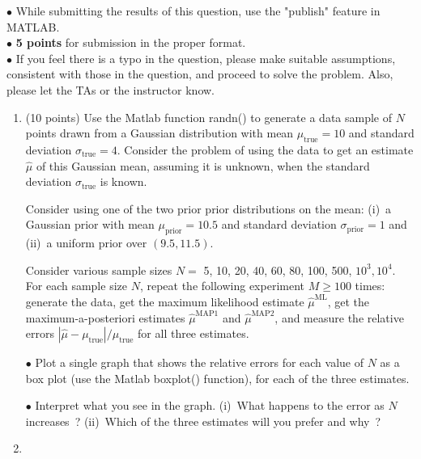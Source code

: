 \documentclass[11pt]{article}
\begin{document}
$\bullet$ While submitting the results of this question, use the "publish" feature in MATLAB. \\

$\bullet$ {\bf 5 points} for submission in the proper format. \\

$\bullet$ If you feel there is a typo in the question, please make suitable assumptions, consistent with those in the question, and proceed to solve
the problem. Also, please let the TAs or the instructor know. \\


\begin {enumerate}
  
\item %
  
  (10 points) Use the Matlab function randn() to generate a data sample of $N$ points drawn from a Gaussian distribution with mean $\mu_{\text{true}}
  = 10$ and standard deviation $\sigma_{\text{true}} = 4$.  Consider the problem of using the data to get an estimate $\widehat \mu$ of this Gaussian
  mean, assuming it is unknown, when the standard deviation $\sigma_{\text{true}}$ is known.
  
  Consider using one of the two prior prior distributions on the mean: (i)~a Gaussian prior with mean $\mu_{\text{prior}} = 10.5$ and standard
  deviation $\sigma_{\text{prior}} = 1$ and (ii)~a uniform prior over $(9.5, 11.5)$.
  
  Consider various sample sizes $N = $ 5, 10, 20, 40, 60, 80, 100, 500, $10^3, 10^4$.  For each sample size $N$, repeat the following experiment $M
  \ge 100$ times: generate the data, get the maximum likelihood estimate $\widehat \mu^{\text{ML}}$, get the maximum-a-posteriori estimates $\widehat
  \mu^{\text{MAP1}}$ and $\widehat \mu^{\text{MAP2}}$, and measure the relative errors $| \widehat \mu - \mu_{\text{true}} | / \mu_{\text{true}}$ for
  all three estimates.
  
  $\bullet$ Plot a single graph that shows the relative errors for each value of $N$ as a box plot (use the Matlab boxplot() function), for each of
  the three estimates.
  
  $\bullet$ Interpret what you see in the graph. (i)~What happens to the error as $N$ increases~? (ii)~Which of the three estimates will you prefer
  and why~?
  
\item %
  

\end{enumerate}
\end{document}
